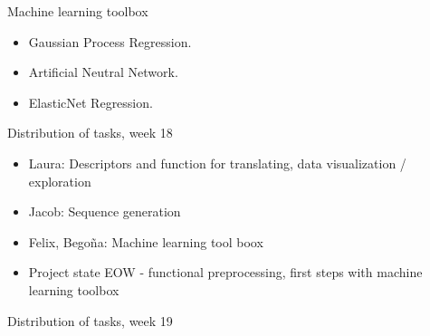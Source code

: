 \documentclass[ignorenonframetext,]{beamer}
\providecommand{\tightlist}{%
  \setlength{\itemsep}{0pt}\setlength{\parskip}{0pt}}
\begin{document}
\begin{frame}
\begin{block}{Machine learning toolbox}
\begin{itemize}
  \begin{itemize}
  \tightlist
  \item
    Gaussian Process Regression.
  \item
    Artificial Neutral Network.
  \item
    ElasticNet Regression.
  \end{itemize}
\end{itemize}

\end{block}

\begin{block}{Distribution of tasks, week 18}

\begin{itemize}
\item
  Laura: Descriptors and function for translating, data visualization /
  exploration
\item
  Jacob: Sequence generation
\item
  Felix, Begoña: Machine learning tool boox
\item
  Project state EOW - functional preprocessing, first steps with machine
  learning toolbox
\end{itemize}

\end{block}

\begin{block}{Distribution of tasks, week 19}

\end{block}

\end{frame}
\end{document}
